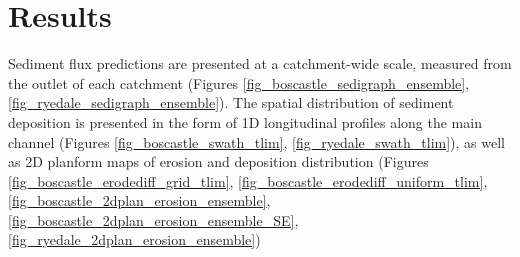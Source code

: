 %
%

\section{Results}

Sediment flux predictions are presented at a catchment-wide scale, measured from the outlet of each catchment (Figures \ref{fig_boscastle_sedigraph_ensemble}, \ref{fig_ryedale_sedigraph_ensemble}). The spatial distribution of sediment deposition is presented in the form of 1D longitudinal profiles along the main channel (Figures \ref{fig_boscastle_swath_tlim}, \ref{fig_ryedale_swath_tlim}), as well as 2D planform maps of erosion and deposition distribution (Figures \ref{fig_boscastle_erodediff_grid_tlim}, \ref{fig_boscastle_erodediff_uniform_tlim}, \ref{fig_boscastle_2dplan_erosion_ensemble}, \ref{fig_boscastle_2dplan_erosion_ensemble_SE}, \ref{fig_ryedale_2dplan_erosion_ensemble})

